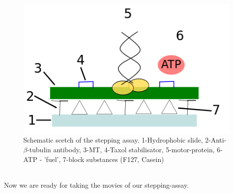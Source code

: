  		\begin{figure}[h]
 			\centering
 		   	\captionsetup{justification=raggedright, margin =4cm}            
 		    	  \includegraphics[scale=0.3]{pic/steppingassay.png}
 		    \caption{Schematic scetch of the stepping assay. 1-Hydrophobic slide, 2-Anti-$\beta$-tubulin antibody, 3-MT, 4-Taxol stabilisator, 5-motor-protein, 6-ATP - 'fuel', 7-block substances (F127, Casein)}
 		   	\label{exp:steppingAssay} 
 		\end{figure}\\
 		Now we are ready for taking the movies of our stepping-assay.
    	     	                 
    	 

